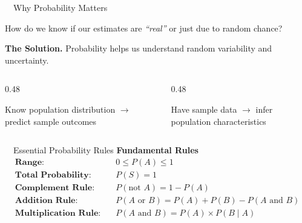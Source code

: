 \documentclass[aspectratio=169,11pt]{beamer}
\begin{document}
\begin{frame}{\ \ Why Probability Matters}
  \begin{keybox}
    How do we know if our estimates are \emph{``real''} or just due to random chance?
  \end{keybox}
  \vspace{0.4em}
  \textbf{\color{qrnavy}The Solution.} Probability helps us understand random
  variability and uncertainty.
  \vspace{0.5em}
  \begin{columns}[T]
    \begin{column}{0.48\textwidth}
      \begin{tcolorbox}[colback=white,colframe=qrnavy,arc=3pt,halign title=center,
        title=\bfseries Probability,coltitle=white,colbacktitle=qrnavy]
        \centering Know population distribution $\rightarrow$ predict sample outcomes
      \end{tcolorbox}
    \end{column}
    \begin{column}{0.48\textwidth}
      \begin{tcolorbox}[colback=white,colframe=qrnavy,arc=3pt,halign title=center,
        title=\bfseries Statistical Inference,coltitle=white,colbacktitle=qrnavy]
        \centering Have sample data $\rightarrow$ infer population characteristics
      \end{tcolorbox}
    \end{column}
  \end{columns}
\end{frame}

\begin{frame}{\ \ Essential Probability Rules}
  \textbf{\color{qrnavy}Fundamental Rules}
  \vspace{0.6em}
  \begin{align*}
    \textbf{Range:} &\quad 0 \le P(A) \le 1\\[0.3em]
    \textbf{Total Probability:} &\quad P(S) = 1\\[0.3em]
    \textbf{Complement Rule:} &\quad P(\text{not } A) = 1 - P(A)\\[0.3em]
    \textbf{Addition Rule:} &\quad P(A \text{ or } B) = P(A) + P(B) - P(A \text{ and } B)\\[0.3em]
    \textbf{Multiplication Rule:} &\quad P(A \text{ and } B) = P(A) \times P(B \mid A)
  \end{align*}
\end{frame}
\end{document}
